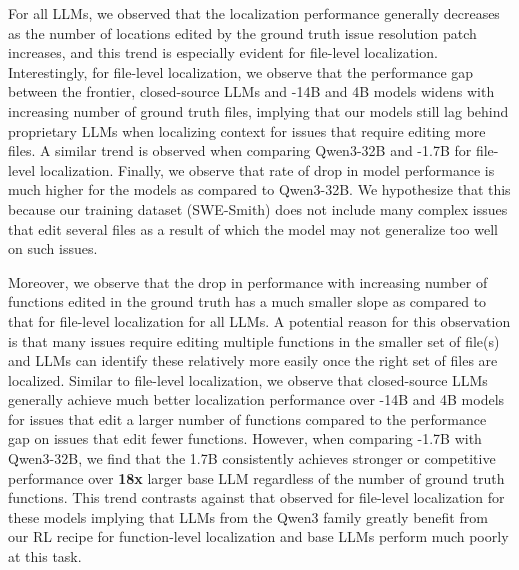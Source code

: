 For all LLMs, we observed that the localization performance generally decreases as the number of locations edited by the ground truth issue resolution patch increases, and this trend is especially evident for file-level localization. Interestingly, for file-level localization, we observe that the performance gap between the frontier, closed-source LLMs and \methodname-14B and 4B models widens with increasing number of ground truth files, implying that our models still lag behind proprietary LLMs when localizing context for issues that require editing more files. A similar trend is observed when comparing Qwen3-32B and \methodname-1.7B for file-level localization. Finally, we observe that rate of drop in model performance is much higher for the \methodname models as compared to Qwen3-32B. We hypothesize that this because our training dataset (SWE-Smith) does not include many complex issues that edit several files as a result of which the model may not generalize too well on such issues.

Moreover, we observe that the drop in performance with increasing number of functions edited in the ground truth has a much smaller slope as compared to that for file-level localization for all LLMs. A potential reason for this observation is that many issues require editing multiple functions in the smaller set of file(s) and LLMs can identify these relatively more easily once the right set of files are localized. Similar to file-level localization, we observe that closed-source LLMs generally achieve much better localization performance over \methodname-14B and 4B models for issues that edit a larger number of functions compared to the performance gap on issues that edit fewer functions. However, when comparing \methodname-1.7B with Qwen3-32B, we find that the 1.7B consistently achieves stronger or competitive performance over \textbf{18x} larger base LLM regardless of the number of ground truth functions. This trend contrasts against that observed for file-level localization for these models implying that LLMs from the Qwen3 family greatly benefit from our RL recipe for function-level localization and base LLMs perform much poorly at this task.


